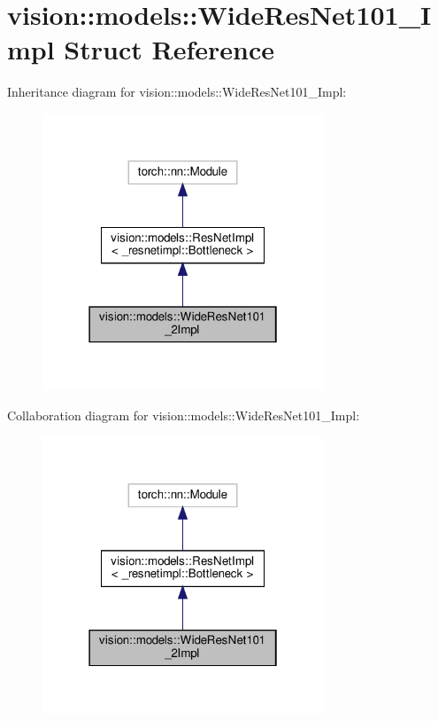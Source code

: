 \hypertarget{structvision_1_1models_1_1WideResNet101__2Impl}{}\section{vision\+:\+:models\+:\+:Wide\+Res\+Net101\+\_\+Impl Struct Reference}
\label{structvision_1_1models_1_1WideResNet101__2Impl}


Inheritance diagram for vision\+:\+:models\+:\+:Wide\+Res\+Net101\+\_\+Impl\+:
\nopagebreak
\begin{figure}[H]
\begin{center}
\leavevmode
\includegraphics[width=238pt]{structvision_1_1models_1_1WideResNet101__2Impl__inherit__graph}
\end{center}
\end{figure}


Collaboration diagram for vision\+:\+:models\+:\+:Wide\+Res\+Net101\+\_\+Impl\+:
\nopagebreak
\begin{figure}[H]
\begin{center}
\leavevmode
\includegraphics[width=238pt]{structvision_1_1models_1_1WideResNet101__2Impl__coll__graph}
\end{center}
\end{figure}
